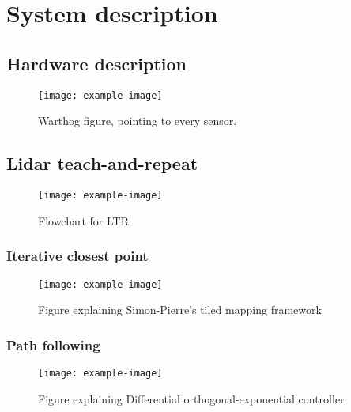 \section{System description}
\label{sec:sys}

\lightlipsum[1]


\subsection{Hardware description}
\label{sec:hardware}

\lightlipsum[1]

\begin{figure} [htpb]
	\centering
	\texttt{[image: example-image]}
	\caption{Warthog figure, pointing to every sensor.}
	\label{fig:warthog}
\end{figure}

\subsection{Lidar teach-and-repeat}
\label{sec:LTR}
\lightlipsum[1]

\begin{figure} [htpb]
	\centering
	\texttt{[image: example-image]}
	\caption{Flowchart for LTR}
	\label{fig:ltr_flow}
\end{figure}

\subsubsection{Iterative closest point}
\label{ICP}

\lightlipsum[1]

\begin{figure} [htpb]
	\centering
	\texttt{[image: example-image]}
	\caption{Figure explaining Simon-Pierre's tiled mapping framework}
	\label{fig:tiled_map}
\end{figure}

\subsubsection{Path following}
\label{sec:orthexp}

\lightlipsum[1]

\begin{figure} [htpb]
	\centering
	\texttt{[image: example-image]}
	\caption{Figure explaining Differential orthogonal-exponential controller}
	\label{fig:diff_orthexp}
\end{figure}